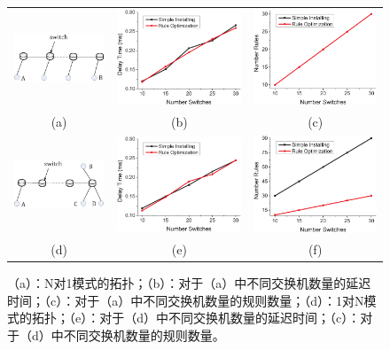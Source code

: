 \documentclass{ctexart}
\begin{document}
\begin{figure} [t]
\begin{center}
\scalebox{0.9}
{
\begin{tabular}{ccc}
\includegraphics[width=0.3\columnwidth]{figures/fig-e-31-a.eps}&
\includegraphics[width=0.3\columnwidth]{figures/fig-e-1-24.eps}&\hspace{-0.1\columnwidth}
\includegraphics[width=0.3\columnwidth]{figures/fig-e-2-24.eps} \\
(a) & (b) & (c)
\\
\includegraphics[width=0.3\columnwidth]{figures/fig-e-31-d.eps}&
\includegraphics[width=0.3\columnwidth]{figures/fig-e-3-24.eps}&\hspace{-0.1\columnwidth}
\includegraphics[width=0.3\columnwidth]{figures/fig-e-4-24.eps} \\
(d) & (e) & (f)
\end{tabular}
}
\caption{（a）：N对1模式的拓扑；（b）：对于（a）中不同交换机数量的延迟时间；（c）：对于（a）中不同交换机数量的规则数量；（d）：1对N模式的拓扑；（e）：对于（d）中不同交换机数量的延迟时间；（c）：对于（d）中不同交换机数量的规则数量。} \label{fig9}
  \end{center}
\vspace{-0.3in}
\end{figure}
\end{document}
